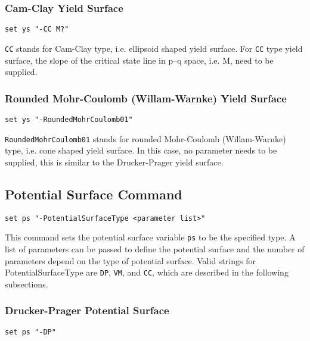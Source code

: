 \subsubsection{Cam-Clay Yield Surface} 
\label{cc_ys}
\begin{verbatim}
set ys "-CC M?"
\end{verbatim}

\texttt{CC}  stands  for  Cam-Clay  type, i.e. ellipsoid shaped
yield surface. For \texttt{CC} type yield surface, the slope of
the  critical  state  line  in  p--q  space, i.e. M, need to be
supplied.

\subsubsection{Rounded Mohr-Coulomb (Willam-Warnke) Yield Surface} 
\label{rmc01_ys}
\begin{verbatim}
set ys "-RoundedMohrCoulomb01"
\end{verbatim}

\texttt{RoundedMohrCoulomb01} stands for rounded Mohr-Coulomb (Willam-Warnke) type, 
i.e. cone shaped
yield  surface. In this case, no parameter needs to be supplied, 
this is similar to the Drucker-Prager yield surface.

\subsection{Potential Surface Command}
\label{PS_Command}

\begin{verbatim}
set ps "-PotentialSurfaceType <parameter list>"
\end{verbatim}

This command sets the potential surface variable \texttt{ps} to
be  the  specified  type. A list of parameters can be passed to
define  the  potential  surface  and  the  number of parameters
depend  on  the  type  of  potential surface. Valid strings for
PotentialSurfaceType    are   \texttt{DP},   \texttt{VM},   and
\texttt{CC}, which are described in the following subsections.

\subsubsection{Drucker-Prager Potential Surface} 
\label{dp_ps}
\begin{verbatim}
set ps "-DP"
\end{verbatim}

